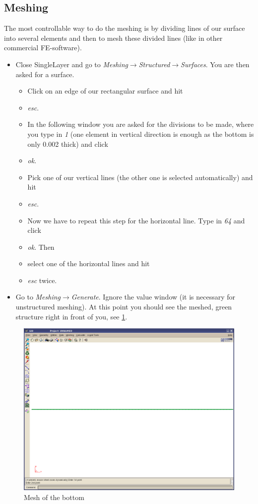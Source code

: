 \subsection{Meshing}

The most controllable way to do the meshing is by dividing lines of
our surface into several elements and then to mesh these divided lines
(like in other commercial FE-software).

\begin{itemize}
\item Close SingleLayer and go to \emph{Meshing$\to$Structured$\to$Surfaces}.
You are then asked for a surface.

\begin{itemize}
\item Click on an edge of our rectangular surface and hit
\item \emph{esc}.
\item In the following window you are asked for the divisions to be made,
where you type in \emph{1} (one element in vertical direction is enough
as the bottom is only 0.002 thick) and click
\item \emph{ok}.
\item Pick one of our vertical lines (the other one is selected automatically)
and hit
\item \emph{esc}.
\item Now we have to repeat this step for the horizontal line. Type in \emph{64}
and click
\item \emph{ok}. Then
\item select one of the horizontal lines and hit
\item \emph{esc} twice.
\end{itemize}
\item Go to \emph{Meshing$\to$Generate}. Ignore the value window (it is
necessary for unstructured meshing). At this point you should see
the meshed, green structure right in front of you, see \ref{tut_fsi:3.2}.
\end{itemize}
%
\begin{figure}[h]
\includegraphics[width=1\columnwidth]{Bilder/structure_02}


\caption{\label{tut_fsi:3.2} Mesh of the bottom}
\end{figure}


